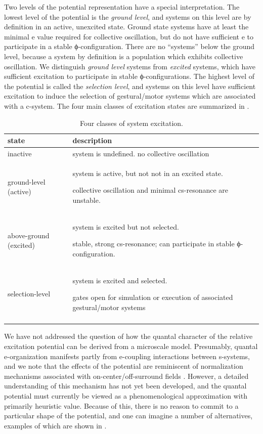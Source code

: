   Two levels of the potential representation have a special  interpretation. The lowest level of the potential is the \textit{ground level}, and systems on this level are by definition in an active, unexcited state. Ground state systems have at least the minimal e value required for collective oscillation, but do not have sufficient e to participate in a stable ϕ-configuration. There are no “systems” below the ground level, because a system by definition is a population which exhibits collective oscillation. We distinguish \textit{ground level} systems from \textit{excited} systems, which have sufficient excitation to participate in stable ϕ-configurations. The highest level of the potential is called the \textit{selection level}, and systems on this level have sufficient excitation to induce the selection of gestural/motor systems which are associated with a c-system. The four main classes of excitation states are summarized in {}.

\begin{table}
\begin{tabularx}{\textwidth}{llQ}
\lsptoprule
\textbf{state} & \textbf{description}\\
\midrule 
inactive & system is undefined. no collective oscillation\\
ground-level (active) & system is active, but not not in an excited state.

collective oscillation and minimal cs-resonance are unstable.\\
above-ground (excited) & system is excited but not selected.

stable, strong cs-resonance; can participate in stable ϕ-configuration.\\
selection-level & system is excited and selected.

gates open for simulation or execution of associated gestural/motor systems\\
\lspbottomrule
\end{tabularx}
\caption{Four classes of system excitation.}\label{tab:1:2}
\end{table}
 
 We have not addressed the question of how the quantal character of the relative excitation potential can be derived from a microscale model. Presumably, quantal e-organization manifests partly from e-coupling interactions between s-systems, and we note that the effects of the potential are reminiscent of normalization mechanisms associated with on-center/off-surround fields \citep{Grossberg1978,Grossberg1987}. However, a detailed understanding of this mechanism has not yet been developed, and the quantal potential must currently be viewed as a phenomenological approximation with primarily heuristic value. Because of this, there is no reason to commit to a particular shape of the potential, and one can imagine a number of alternatives, examples of which are shown in {}.


